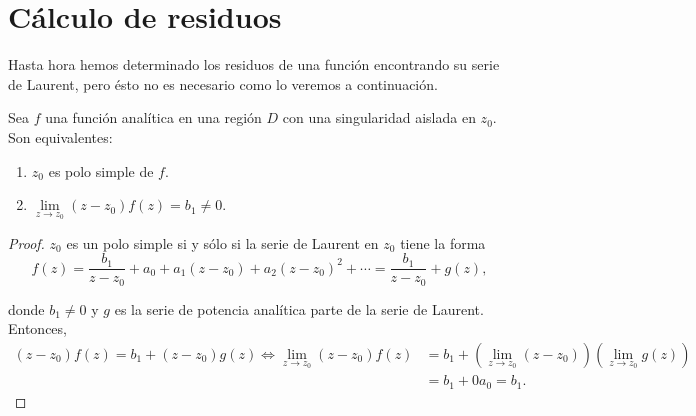 \section{Cálculo de residuos}

Hasta hora hemos determinado los residuos de una función encontrando su serie de Laurent, pero ésto no es necesario como lo veremos a continuación. 

\begin{teorema}
Sea $f$ una función analítica en una región $D$ con una singularidad aislada en $z_0$. Son equivalentes:
\begin{enumerate}
    \item $z_0$ es polo simple de $f$.
    
    \item $\lim\limits_{z\to z_0} (z-z_0) f(z) = b_1 \neq 0$.
\end{enumerate}
\end{teorema}

\begin{proof}
$z_0$ es un polo simple si y sólo si la serie de Laurent en $z_0$ tiene la forma
$$f(z) = \frac{b_1}{z-z_0} + a_0 + a_1 (z-z_0) + a_2(z-z_0)^2 + \cdots = \frac{b_1}{z-z_0} + g(z),$$

donde $b_1 \neq 0$ y $g$ es la serie de potencia analítica parte de la serie de Laurent. Entonces,
\begin{align*}
 (z-z_0)f(z) = b_1 + (z-z_0)g(z) \Leftrightarrow \lim_{z\to z_0} (z-z_0) f(z) &= b_1 + \left( \lim_{z\to z_0} (z-z_0)\right) \left(\lim_{z\to z_0} g(z) \right) \\
 &= b_1 + 0 a_0 = b_1.   
\end{align*}

\end{proof}

